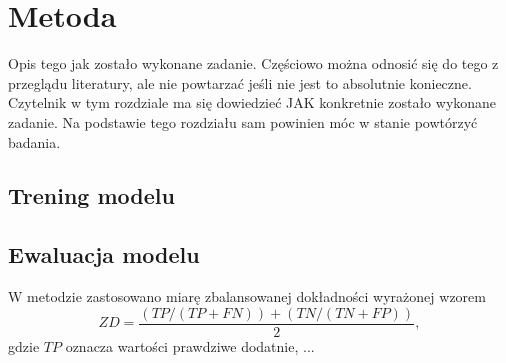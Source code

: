 \section{Metoda}
\label{sec:metoda}

Opis tego jak zostało wykonane zadanie. Częściowo można odnosić się do tego z przeglądu literatury, ale nie powtarzać jeśli nie jest to absolutnie konieczne. Czytelnik w tym rozdziale ma się dowiedzieć JAK konkretnie zostało wykonane zadanie. Na podstawie tego rozdziału sam powinien móc w stanie powtórzyć badania.  

\subsection{Trening modelu}



\subsection{Ewaluacja modelu}

W metodzie zastosowano miarę zbalansowanej dokładności wyrażonej wzorem 
\begin{equation}
    \label{eqn:balanced_accuracy}
    ZD = \frac{(TP/(TP+FN))+(TN/(TN+FP))}{2},
\end{equation}
gdzie $TP$ oznacza wartości prawdziwe dodatnie, ...
